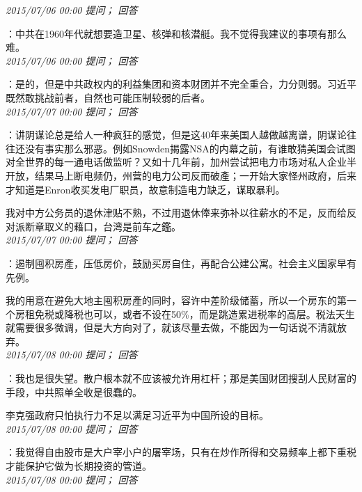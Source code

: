 \documentclass[twocolumn]{ctexart}
\begin{document}
\textit{\hfill\noindent\small 2015/07/06 00:00 提问； 回答}

：中共在1960年代就想要造卫星、核弹和核潜艇。我不觉得我建议的事项有那么难。\\

\textit{\hfill\noindent\small 2015/07/06 00:00 提问； 回答}

：是的，但是中共政权内的利益集团和资本财团并不完全重合，力分则弱。习近平既然敢挑战前者，自然也可能压制较弱的后者。\\

\textit{\hfill\noindent\small 2015/07/07 00:00 提问； 回答}

：讲阴谋论总是给人一种疯狂的感觉，但是这40年来美国人越做越离谱，阴谋论往往还没有事实那么邪恶。例如Snowden揭露NSA的内幕之前，有谁敢猜美国会试图对全世界的每一通电话做监听？又如十几年前，加州尝试把电力市场对私人企业半开放，结果马上断电频仍，州营的电力公司反而破產；一开始大家怪州政府，后来才知道是Enron收买发电厂职员，故意制造电力缺乏，谋取暴利。

我对中方公务员的退休津贴不熟，不过用退休俸来弥补以往薪水的不足，反而给反对派断章取义的藉口，台湾是前车之鑑。\\

\textit{\hfill\noindent\small 2015/07/07 00:00 提问； 回答}

：遏制囤积房產，压低房价，鼓励买房自住，再配合公建公寓。社会主义国家早有先例。

我的用意在避免大地主囤积房產的同时，容许中差阶级储蓄，所以一个房东的第一个房租免税或降税也可以，或者不设在50\%，而是跳造累进税率的高层。税法天生就需要很多微调，但是大方向对了，就该尽量去做，不能因为一句话说不清就放弃。\\

\textit{\hfill\noindent\small 2015/07/08 00:00 提问； 回答}

：我也是很失望。散户根本就不应该被允许用杠杆；那是美国财团搜刮人民财富的手段，中共照单全收是很蠢的。

李克强政府只怕执行力不足以满足习近平为中国所设的目标。\\

\textit{\hfill\noindent\small 2015/07/08 00:00 提问； 回答}

：我觉得自由股市是大户宰小户的屠宰场，只有在炒作所得和交易频率上都下重税才能保护它做为长期投资的管道。\\

\textit{\hfill\noindent\small 2015/07/08 00:00 提问； 回答}
\end{document}

